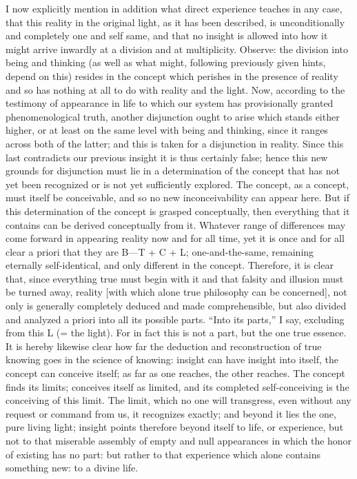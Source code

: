 I now explicitly mention in addition
what direct experience teaches in any case,
that this reality in the original light,
as it has been described,
is unconditionally and completely one and self same,
and that no insight is allowed into how it might arrive
inwardly at a division and at multiplicity.
Observe: the division into being and thinking
(as well as what might, following previously given hints, depend on this)
resides in the concept
which perishes in the presence of reality
and so has nothing at all to do with reality and the light.
Now, according to the testimony of appearance in life
to which our system has provisionally
granted phenomenological truth,
another disjunction ought to arise
which stands either higher,
or at least on the same level
with being and thinking,
since it ranges across both of the latter;
and this is taken for a disjunction in reality.
Since this last contradicts our previous
insight it is thus certainly false;
hence this new grounds for disjunction must
lie in a determination of the concept
that has not yet been recognized
or is not yet sufficiently explored.
The concept, as a concept, must itself be conceivable,
and so no new inconceivability can appear here.
But if this determination of
the concept is grasped conceptually,
then everything that it contains can be
derived conceptually from it.
Whatever range of differences may come forward
in appearing reality now and for all time,
yet it is once and for all clear
a priori that they are B—T + C + L;
one-and-the-same,
remaining eternally self-identical,
and only different in the concept.
Therefore, it is clear that,
since everything true must begin with it
and that falsity and illusion must be turned away,
reality [with which alone true philosophy can be concerned],
not only is generally completely deduced
and made comprehensible,
but also divided and analyzed a priori
into all its possible parts.
“Into its parts,” I say,
excluding from this L (= the light).
For in fact this is not a part,
but the one true essence.
It is hereby likewise clear how far
the deduction and reconstruction of
true knowing goes in the science of knowing:
insight can have insight into itself,
the concept can conceive itself;
as far as one reaches, the other reaches.
The concept finds its limits;
conceives itself as limited,
and its completed self-conceiving is
the conceiving of this limit.
The limit, which no one will transgress,
even without any request or command from us,
it recognizes exactly;
and beyond it lies the one, pure living light;
insight points therefore beyond itself
to life, or experience,
but not to that miserable assembly of
empty and null appearances in which
the honor of existing has no part:
but rather to that experience
which alone contains something new:
to a divine life.

